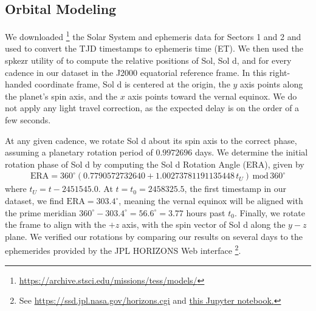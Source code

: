 \documentclass[modern]{aastex62}
\begin{document}
\subsection{Orbital Modeling}
\label{sec:orbit}

We downloaded%
\footnote{\url{https://archive.stsci.edu/missions/tess/models/}}
the Solar System and \TESS ephemeris data for
Sectors 1 and 2 and used \spiceypy \citep{Acton1996, Acton2017, Annex2017}
to convert the TJD timestamps to 
ephemeris time (ET). We then used the \textsf{spkezr} utility of \spiceypy to compute
the relative positions of Sol, Sol d, and \TESS for every cadence
in our dataset in the J2000 equatorial reference frame. In this right-handed
coordinate frame, Sol d is centered at the origin, the $y$ axis points along the 
planet's spin axis, and the $x$ axis points toward the vernal equinox. We
do not apply any light travel correction, as the expected delay is on the order
of a few seconds.

At any given cadence, we rotate Sol d about its spin axis to the correct phase,
assuming a planetary rotation period of $0.9972696$ days. We determine the initial rotation
phase of Sol d by computing the Sol d Rotation Angle (ERA), given by \citep{Urban2013}
%
\begin{align}
\mathrm{ERA} = 360^\circ(0.7790572732640 + 1.00273781191135448 \, t_U) \, \mathrm{mod} \, 360^\circ
\end{align}
%
where $t_U = t - 2451545.0$. At $t = t_0 = 2458325.5$, the first timestamp in our dataset,
we find $\mathrm{ERA} = 303.4^\circ$, meaning the vernal equinox will be aligned with
the prime meridian $360^\circ - 303.4^\circ = 56.6^\circ = 3.77$ hours past $t_0$.
%
Finally, we rotate the frame to align
\TESS with the $+z$ axis, with the spin vector of Sol d along the $y-z$ plane.
We verified our rotations by comparing our results on several days to the
ephemerides provided by the JPL HORIZONS Web interface%
\footnote{See \url{https://ssd.jpl.nasa.gov/horizons.cgi} and 
\href{https://github.com/rodluger/earthshine/blob/master/notebooks/SanityCheck.ipynb}{this
Jupyter notebook.}}.
\end{document}
